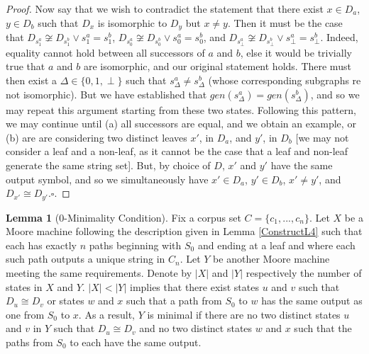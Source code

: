 \documentclass{article}
\theoremstyle{definition}
\newtheorem{lemma}{Lemma}[section]
\begin{document}
\begin{proof}
Now say that we wish to contradict the statement that there exist 
$x \in D_a$, $y \in D_b$ such that $D_x$ is isomorphic to $D_y$ but $x \neq y$.  Then it must be the 
case that $D_{s_1^{a}} \not\cong D_{s_1^{b}} \lor s_1^{a} = s_1^{b}$, 
$D_{s_0^{a}} \not\cong D_{s_0^{b}} \lor s_0^{a} = s_0^{b}$, and 
$D_{s_\perp^{a}} \not\cong D_{s_\perp^{b}} \lor s_\perp^{a} = s_\perp^{b}$.  Indeed, equality cannot 
hold between all successors of $a$ and $b$, else it would be trivially true that $a$ and $b$ are isomorphic, 
and our original statement holds.  There must then exist a $\Delta \in \{0,1,\perp\}$ such that 
$s_\Delta^{a} \neq s_\Delta^{b}$ (whose corresponding subgraphs re not isomorphic).  But we have established that 
$gen(s_\Delta^{a}) = gen(s_\Delta^{b})$, and so we may repeat this argument starting from these 
two states.  Following this pattern, we may continue until (a) all successors are equal, and we 
obtain an example, or (b) are are considering two distinct leaves $x'$, in $D_a$, and $y'$, in $D_b$ 
[we may not consider a leaf and a non-leaf, as it cannot be the case that a leaf and non-leaf generate the same string set].  
But, by choice of $D$, $x'$ and $y'$ have the same output symbol, and so we simultaneously have
$x' \in D_a$, $y' \in D_b$, $x' \neq y'$, and $D_{x'} \cong D_{y'}$.$\square$.
\end{proof}

\begin{lemma}[0-Minimality Condition]
\label{ConstructL5}
Fix a corpus set $C=\{c_1,...,c_n\}$.  Let $X$ be a Moore machine following the 
description given in Lemma \ref{ConstructL4} such that each has exactly $n$ paths 
beginning with $S_0$ and ending at a leaf and where each such path outputs a unique 
string in $C_n$.  Let $Y$ be another Moore machine meeting the same requirements.
Denote by $\lvert X \rvert$ and $\lvert Y \rvert$ respectively the number of states in $X$  
and $Y$.
\newline\newline
\noindent $\lvert X \rvert < \lvert Y \rvert$ implies that there exist states $u$ and 
$v$ such that $D_u \cong D_v$ or states $w$ and $x$ such that a path from 
$S_0$ to $w$ has the same output as one from $S_0$ to $x$.  
As a result, $Y$ is minimal if there are no two distinct 
states $u$ and $v$ in $Y$ such that $D_u \cong D_v$ and no two distinct states $w$ and $x$ 
such that the paths from $S_0$ to each have the same output.
\end{lemma}
\end{document}
